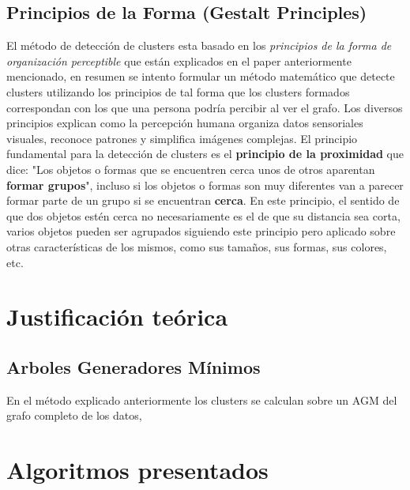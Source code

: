 \documentclass[8pt,a4paper]{article}
\begin{document}
\subsection{Principios de la Forma (Gestalt Principles)}

El método de detección de clusters esta basado en los \textit{principios de la forma de organización perceptible} que están explicados en el paper anteriormente mencionado, en resumen se intento formular un método matemático que detecte clusters utilizando los principios de tal forma que los clusters formados correspondan con los que una persona podría percibir al ver el grafo.
Los diversos principios explican como la percepción humana organiza datos sensoriales visuales, reconoce patrones y simplifica imágenes complejas. El principio fundamental para la detección de clusters es el \textbf{principio de la proximidad} que dice: "Los objetos o formas que se encuentren cerca unos de otros aparentan \textbf{formar grupos}", incluso si los objetos o formas son muy diferentes van a parecer formar parte de un grupo si se encuentran \textbf{cerca}. En este principio, el sentido de que dos objetos estén cerca no necesariamente es el de que su distancia sea corta, varios objetos pueden ser agrupados siguiendo este principio pero aplicado sobre otras características de los mismos, como sus tamaños, sus formas, sus colores, etc.

\section{Justificación teórica}

\subsection{Arboles Generadores Mínimos}
En el método explicado anteriormente los clusters se calculan sobre un AGM del grafo completo de los datos, 

\section{Algoritmos presentados}

\end{document}
